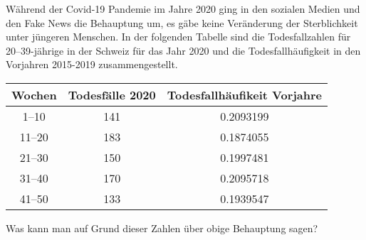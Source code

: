 Während der Covid-19 Pandemie im Jahre 2020 ging in den sozialen Medien
und den Fake News die Behauptung um, es gäbe keine Veränderung der
Sterblichkeit unter jüngeren Menschen.
In der folgenden Tabelle sind die Todesfallzahlen für
20--39-jährige in der Schweiz für
das Jahr 2020 und die Todesfallhäufigkeit in den Vorjahren 2015-2019
zusammengestellt.
\begin{center}
\begin{tabular}{|c|c|c|}
\hline
Wochen         &Todesfälle 2020&Todesfallhäufikeit Vorjahre\\
\hline
\phantom{0}1--10&            141&         0.2093199 \\
          11--20&            183&         0.1874055 \\
          21--30&            150&         0.1997481 \\
          31--40&            170&         0.2095718 \\
          41--50&            133&         0.1939547 \\
\hline
\end{tabular}
\end{center}
Was kann man auf Grund dieser Zahlen über obige Behauptung sagen?

